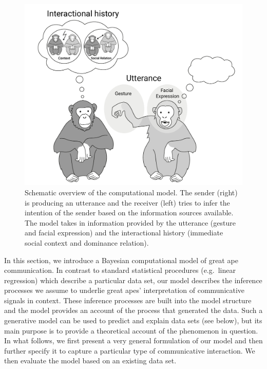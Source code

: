 \documentclass[
  man,floatsintext]{apa6}
\begin{document}
\begin{figure}

{\centering \includegraphics[width=1\linewidth]{./figures/Fig1} 

}

\caption{Schematic overview of the computational model. The sender (right) is producing an utterance and the receiver (left) tries to infer the intention of the sender based on the information sources available. The model takes in information provided by the utterance (gesture and facial expression) and the interactional history (immediate social context and dominance relation).}\label{fig:fig1}
\end{figure}

In this section, we introduce a Bayesian computational model of great ape communication. In contrast to standard statistical procedures (e.g.~linear regression) which describe a particular data set, our model describes the inference processes we assume to underlie great apes' interpretation of communicative signals in context. These inference processes are built into the model structure and the model provides an account of the process that generated the data. Such a generative model can be used to predict and explain data sets (see below), but its main purpose is to provide a theoretical account of the phenomenon in question. In what follows, we first present a very general formulation of our model and then further specify it to capture a particular type of communicative interaction. We then evaluate the model based on an existing data set.
\end{document}
